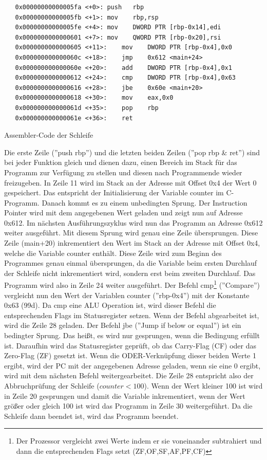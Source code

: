 \documentclass[a4paper,12pt]{article}
\begin{document}
\begin{code}[!htb]
\begin{lstlisting}
   0x00000000000005fa <+0>:	push   rbp
   0x00000000000005fb <+1>:	mov    rbp,rsp
   0x00000000000005fe <+4>:	mov    DWORD PTR [rbp-0x14],edi
   0x0000000000000601 <+7>:	mov    QWORD PTR [rbp-0x20],rsi
   0x0000000000000605 <+11>:	mov    DWORD PTR [rbp-0x4],0x0
   0x000000000000060c <+18>:	jmp    0x612 <main+24>
   0x000000000000060e <+20>:	add    DWORD PTR [rbp-0x4],0x1
   0x0000000000000612 <+24>:	cmp    DWORD PTR [rbp-0x4],0x63
   0x0000000000000616 <+28>:	jbe    0x60e <main+20>
   0x0000000000000618 <+30>:	mov    eax,0x0
   0x000000000000061d <+35>:	pop    rbp
   0x000000000000061e <+36>:	ret    
\end{lstlisting}
\caption[Assembler Code einfache Schleife]{Assembler-Code der Schleife}
\label{code:scheifeasm}
\end{code}

\noindent Die erste Zeile (''push rbp'') und die letzten beiden Zeilen (''pop rbp \& ret'') sind bei jeder Funktion gleich und dienen dazu, einen Bereich im Stack für das Programm zur Verfügung zu stellen und diesen nach Programmende wieder freizugeben. In Zeile 11 wird im Stack an der Adresse mit Offset 0x4 der Wert 0 gespeichert. Das entspricht der Initialisierung der Variable counter im C-Programm. Danach kommt es zu einem unbedingten Sprung. Der Instruction Pointer wird mit dem angegebenen Wert geladen und zeigt nun auf Adresse 0x612. Im nächsten Ausführungszyklus wird nun das Programm an Adresse 0x612 weiter ausgeführt. Mit diesem Sprung wird genau eine Zeile übersprungen. Diese Zeile (main+20) inkrementiert den Wert im Stack an der Adresse mit Offset 0x4, welche die Variable counter enthält. Diese Zeile wird zum Beginn des Programmes genau einmal übersprungen, da die  Variable beim ersten Durchlauf der Schleife nicht inkrementiert wird, sondern erst beim zweiten Durchlauf. Das Programm wird also in Zeile 24 weiter ausgeführt. Der Befehl cmp\footnote{Der Prozessor vergleicht zwei Werte indem er sie voneinander subtrahiert und dann die entsprechenden Flags setzt (ZF,OF,SF,AF,PF,CF)\cite[S.176]{intel4000}} (''Compare'') vergleicht nun den Wert der Variablen counter (''rbp-0x4'') mit der Konstante 0x63 (99d). Da cmp eine ALU Operation ist, wird dieser Befehl die entsprechenden Flags im Statusregister setzen. Wenn der Befehl abgearbeitet ist, wird die Zeile 28 geladen. Der Befehl jbe (''Jump if below or equal'') ist ein bedingter Sprung. Das heißt, es wird nur gesprungen, wenn die Bedingung erfüllt ist. Daraufhin wird das Statusregister geprüft, ob das Carry-Flag (CF) oder das Zero-Flag (ZF) gesetzt ist. Wenn die ODER-Verknüpfung dieser beiden Werte 1 ergibt, wird der PC mit der angegebenen Adresse geladen, wenn sie eine 0 ergibt, wird mit dem nächsten Befehl weitergearbeitet\cite[S.1060]{intel4000}. Die Zeile 28 entspricht also der Abbruchprüfung der Schleife  ($counter < 100$). Wenn der Wert kleiner 100 ist wird in Zeile 20 gesprungen und damit die Variable inkrementiert, wenn der Wert größer oder gleich 100 ist wird das Programm in Zeile 30 weitergeführt. Da die Schleife dann beendet ist, wird das Programm beendet.
\end{document}

